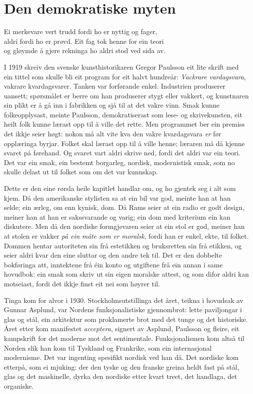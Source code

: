 \chapter{Den demokratiske myten}

\begin{motto}
Ei merkevare vert trudd fordi ho er nyttig og fager,\\ aldri fordi ho er prøvd. Eit fag tok henne for ein teori\\ og gløymde å gjere rekninga ho aldri stod ved sida av.
\end{motto}

I 1919 skreiv den svenske kunsthistorikaren Gregor Paulsson eit lite skrift med ein tittel som skulle bli eit program for eit halvt hundreår: \textit{Vackrare vardagsvara}, vakrare kvardagsvarer. Tanken var forførande enkel. Industrien produserer uansett; spørsmålet er berre om han produserer stygt eller vakkert, og kunstnaren sin plikt er å gå inn i fabrikken og sjå til at det vakre vinn. Smak kunne folkeopplysast, meinte Paulsson, demokratiserast som lese- og skrivekunsten, eit heilt folk kunne lærast opp til å ville det rette. Men programmet ber ein premiss det ikkje seier høgt: nokon må alt vite kva den vakre kvardagsvara \emph{er} før opplæringa byrjar. Folket skal lærast opp til å ville henne; læraren må då kjenne svaret på førehand. Og svaret vart aldri skrive ned, fordi det aldri var ein teori. Det var ein smak, ein bestemt borgarleg, nordisk, modernistisk smak, som no skulle delast ut til folket som om det var kunnskap.

Dette er den eine rørsla heile kapitlet handlar om, og ho gjentek seg i alt som kjem. Då den amerikanske stylisten sa at ein bil var god, meinte han at han selde; ein ærleg, om enn kynisk, dom. Då Rams seier at ein radio er godt design, meiner han at han er sakssvarande og varig; ein dom med kriterium ein kan diskutere. Men då den nordiske formgjevaren seier at ein stol er god, meiner han at stolen er vakker \emph{på ein måte som er moralsk}, fordi han er enkel, ekte, til folket. Dommen hentar autoriteten sin frå estetikken og bruksretten sin frå etikken, og seier aldri kvar den eine sluttar og den andre tek til. Det er den dobbelte bokføringa att, inntektene frå éin konto og utgiftene frå ein annan i same hovudbok: ein smak som skriv ut sin eigen moralske attest, og som difor aldri kan motseiast, fordi det ikkje finst eit nei som høyrer til.

Tinga kom for alvor i 1930. Stockholmsutstillinga det året, teikna i hovudsak av Gunnar Asplund, var Nordens funksjonalistiske gjennombrot: lette paviljongar i glas og stål, ein arkitektur som proklamerte brot med det tunge og det historiske. Året etter kom manifestet \textit{acceptera}, signert av Asplund, Paulsson og fleire, eit kampskrift for det moderne mot det sentimentale. Funksjonalismen kom altså til Norden slik han kom til Tyskland og Frankrike, som ein internasjonal modernisme. Det var ingenting spesifikt nordisk ved han då. Det nordiske kom etterpå, som ei mjuking: der den tyske og den franske greina heldt fast på stål, glas og det maskinelle, dyrka den nordiske etter kvart treet, det handlaga, det organiske.

